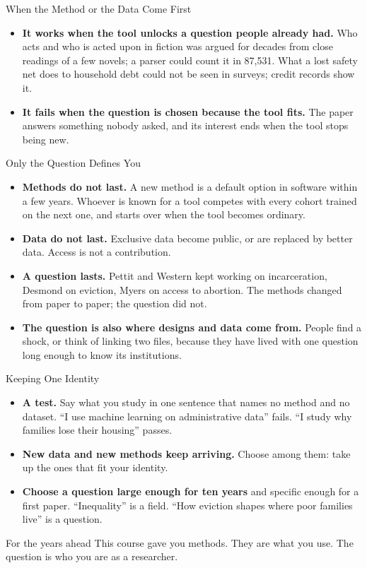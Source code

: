 \documentclass[aspectratio=169,11pt,xcolor=dvipsnames]{beamer}
\begin{document}
\begin{frame}{When the Method or the Data Come First}
\begin{itemize}\itemsep6pt
  \item \textbf{It works when the tool unlocks a question people already had.} Who acts and who
        is acted upon in fiction was argued for decades from close readings of a few novels; a
        parser could count it in 87,531. What a lost safety net does to household debt could not be seen in
        surveys; credit records show it.
  \item \textbf{It fails when the question is chosen because the tool fits.} The paper answers
        something nobody asked, and its interest ends when the tool stops being new.
\end{itemize}
\end{frame}

\begin{frame}{Only the Question Defines You}
\begin{itemize}\itemsep6pt
  \item \textbf{Methods do not last.} A new method is a default option in software within a few
        years. Whoever is known for a tool competes with every cohort trained on the next one,
        and starts over when the tool becomes ordinary.
  \item \textbf{Data do not last.} Exclusive data become public, or are replaced by better data.
        Access is not a contribution.
  \item \textbf{A question lasts.} Pettit and Western kept working on incarceration, Desmond on
        eviction, Myers on access to abortion. The methods changed from paper to paper; the
        question did not.
  \item \textbf{The question is also where designs and data come from.} People find a shock, or
        think of linking two files, because they have lived with one question long enough to
        know its institutions.
\end{itemize}
\end{frame}

\begin{frame}{Keeping One Identity}
\begin{itemize}\itemsep5pt
  \item \textbf{A test.} Say what you study in one sentence that names no method and no dataset.
        ``I use machine learning on administrative data'' fails. ``I study why families lose
        their housing'' passes.
  \item \textbf{New data and new methods keep arriving.} Choose among them: take up the ones
        that fit your identity.
  \item \textbf{Choose a question large enough for ten years} and specific enough for a first
        paper. ``Inequality'' is a field. ``How eviction shapes where poor families live'' is a
        question.
\end{itemize}
\vskip2pt
\begin{alertblock}{For the years ahead}
This course gave you methods. They are what you use. The question is who you are as a
researcher.
\end{alertblock}
\end{frame}
\end{document}
